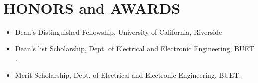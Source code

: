 \documentclass[a4paper,7 pt]{article}
\begin{document}










\section{HONORS and AWARDS}

\begin{itemize}
    \item Dean’s Distinguished Fellowship, University of California, Riverside
    \item Dean's list Scholarship, Dept. of Electrical and Electronic Engineering, BUET .
    \item Merit Scholarship, Dept. of Electrical and Electronic Engineering, BUET.
\end{itemize}
\end{document}

